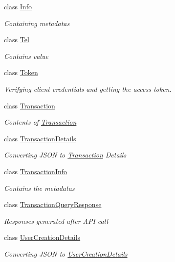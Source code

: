 \begin{DoxyCompactItemize}
class \hyperlink{class_giift_a_p_i_c_sharp_1_1_info}{Info}
\begin{DoxyCompactList}\small\item\em Containing metadatas \end{DoxyCompactList}\item 
class \hyperlink{class_giift_a_p_i_c_sharp_1_1_tel}{Tel}
\begin{DoxyCompactList}\small\item\em Contains value \end{DoxyCompactList}\item 
class \hyperlink{class_giift_a_p_i_c_sharp_1_1_token}{Token}
\begin{DoxyCompactList}\small\item\em Verifying client credentials and getting the access token. \end{DoxyCompactList}\item 
class \hyperlink{class_giift_a_p_i_c_sharp_1_1_transaction}{Transaction}
\begin{DoxyCompactList}\small\item\em Contents of \hyperlink{class_giift_a_p_i_c_sharp_1_1_transaction}{Transaction} \end{DoxyCompactList}\item 
class \hyperlink{class_giift_a_p_i_c_sharp_1_1_transaction_details}{Transaction\+Details}
\begin{DoxyCompactList}\small\item\em Converting J\+S\+ON to \hyperlink{class_giift_a_p_i_c_sharp_1_1_transaction}{Transaction} Details \end{DoxyCompactList}\item 
class \hyperlink{class_giift_a_p_i_c_sharp_1_1_transaction_info}{Transaction\+Info}
\begin{DoxyCompactList}\small\item\em Contains the metadatas \end{DoxyCompactList}\item 
class \hyperlink{class_giift_a_p_i_c_sharp_1_1_transaction_query_response}{Transaction\+Query\+Response}
\begin{DoxyCompactList}\small\item\em Responses generated after A\+PI call \end{DoxyCompactList}\item 
class \hyperlink{class_giift_a_p_i_c_sharp_1_1_user_creation_details}{User\+Creation\+Details}
\begin{DoxyCompactList}\small\item\em Converting J\+S\+ON to \hyperlink{class_giift_a_p_i_c_sharp_1_1_user_creation_details}{User\+Creation\+Details} \end{DoxyCompactList}\item 

\end{DoxyCompactItemize}
